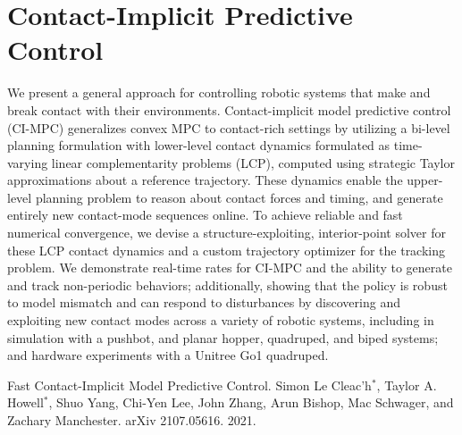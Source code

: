 \chapter{Contact-Implicit Predictive Control}

We present a general approach for controlling robotic systems that make and break contact with their environments. Contact-implicit model predictive control (CI-MPC) generalizes convex MPC to contact-rich settings by utilizing a bi-level planning formulation with lower-level contact dynamics formulated as time-varying linear complementarity problems (LCP), computed using strategic Taylor approximations about a reference trajectory. These dynamics enable the upper-level planning problem to reason about contact forces and timing, and generate entirely new contact-mode sequences online. To achieve reliable and fast numerical convergence, we devise a structure-exploiting, interior-point solver for these LCP contact dynamics and a custom trajectory optimizer for the tracking problem. We demonstrate real-time rates for CI-MPC and the ability to generate and track non-periodic behaviors; additionally, showing that the policy is robust to model mismatch and can respond to disturbances by discovering and exploiting new contact modes across a variety of robotic systems, including in simulation with a pushbot, and planar hopper, quadruped, and biped systems; and hardware experiments with a Unitree Go1 quadruped.

\vspace*{\fill}

\noindent Fast Contact-Implicit Model Predictive  Control. Simon Le Cleac'h$^*$, Taylor A. Howell$^*$, Shuo Yang, Chi-Yen Lee, John Zhang, Arun Bishop, Mac Schwager, and Zachary Manchester. arXiv 2107.05616. 2021.

\pagebreak 

